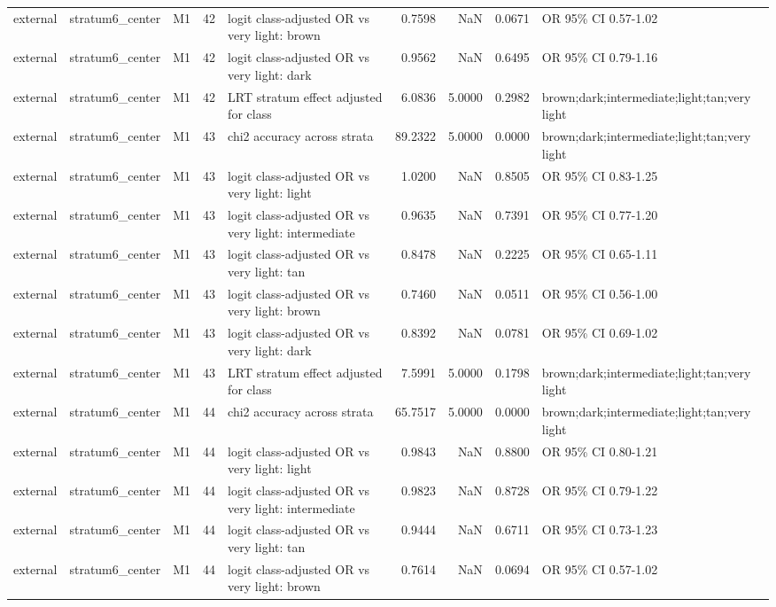 \begin{tabular}{lllrlrrrl}
external & stratum6\_center & M1 & 42 & logit class-adjusted OR vs very light: brown & 0.7598 & NaN & 0.0671 & OR 95\% CI 0.57-1.02 \\
external & stratum6\_center & M1 & 42 & logit class-adjusted OR vs very light: dark & 0.9562 & NaN & 0.6495 & OR 95\% CI 0.79-1.16 \\
external & stratum6\_center & M1 & 42 & LRT stratum effect adjusted for class & 6.0836 & 5.0000 & 0.2982 & brown;dark;intermediate;light;tan;very light \\
external & stratum6\_center & M1 & 43 & chi2 accuracy across strata & 89.2322 & 5.0000 & 0.0000 & brown;dark;intermediate;light;tan;very light \\
external & stratum6\_center & M1 & 43 & logit class-adjusted OR vs very light: light & 1.0200 & NaN & 0.8505 & OR 95\% CI 0.83-1.25 \\
external & stratum6\_center & M1 & 43 & logit class-adjusted OR vs very light: intermediate & 0.9635 & NaN & 0.7391 & OR 95\% CI 0.77-1.20 \\
external & stratum6\_center & M1 & 43 & logit class-adjusted OR vs very light: tan & 0.8478 & NaN & 0.2225 & OR 95\% CI 0.65-1.11 \\
external & stratum6\_center & M1 & 43 & logit class-adjusted OR vs very light: brown & 0.7460 & NaN & 0.0511 & OR 95\% CI 0.56-1.00 \\
external & stratum6\_center & M1 & 43 & logit class-adjusted OR vs very light: dark & 0.8392 & NaN & 0.0781 & OR 95\% CI 0.69-1.02 \\
external & stratum6\_center & M1 & 43 & LRT stratum effect adjusted for class & 7.5991 & 5.0000 & 0.1798 & brown;dark;intermediate;light;tan;very light \\
external & stratum6\_center & M1 & 44 & chi2 accuracy across strata & 65.7517 & 5.0000 & 0.0000 & brown;dark;intermediate;light;tan;very light \\
external & stratum6\_center & M1 & 44 & logit class-adjusted OR vs very light: light & 0.9843 & NaN & 0.8800 & OR 95\% CI 0.80-1.21 \\
external & stratum6\_center & M1 & 44 & logit class-adjusted OR vs very light: intermediate & 0.9823 & NaN & 0.8728 & OR 95\% CI 0.79-1.22 \\
external & stratum6\_center & M1 & 44 & logit class-adjusted OR vs very light: tan & 0.9444 & NaN & 0.6711 & OR 95\% CI 0.73-1.23 \\
external & stratum6\_center & M1 & 44 & logit class-adjusted OR vs very light: brown & 0.7614 & NaN & 0.0694 & OR 95\% CI 0.57-1.02 \\

\end{tabular}
